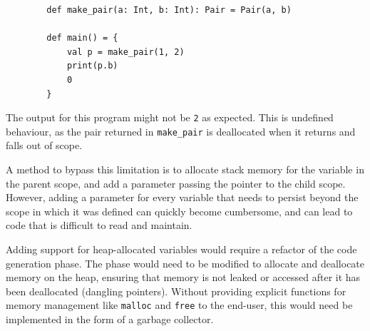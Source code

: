 \begin{tcolorbox}
    \begin{verbatim}
        def make_pair(a: Int, b: Int): Pair = Pair(a, b)

        def main() = {
            val p = make_pair(1, 2)
            print(p.b)
            0
        }
    \end{verbatim}
    \tcblower
    \footnotesize
    The output for this program might not be \texttt{2} as expected. This is undefined behaviour, as
    the pair returned in \texttt{make\_pair} is deallocated when it returns and falls out of scope.
\end{tcolorbox}

A method to bypass this limitation is to allocate stack memory for the variable in the parent scope,
and add a parameter passing the pointer to the child scope. However, adding a parameter for every
variable that needs to persist beyond the scope in which it was defined can quickly become
cumbersome, and can lead to code that is difficult to read and maintain.

Adding support for heap-allocated variables would require a refactor of the code generation phase.
The phase would need to be modified to allocate and deallocate memory on the heap, ensuring that
memory is not leaked or accessed after it has been deallocated (dangling pointers). Without
providing explicit functions for memory management like \texttt{malloc} and \texttt{free} to the
end-user, this would need be implemented in the form of a garbage collector.
